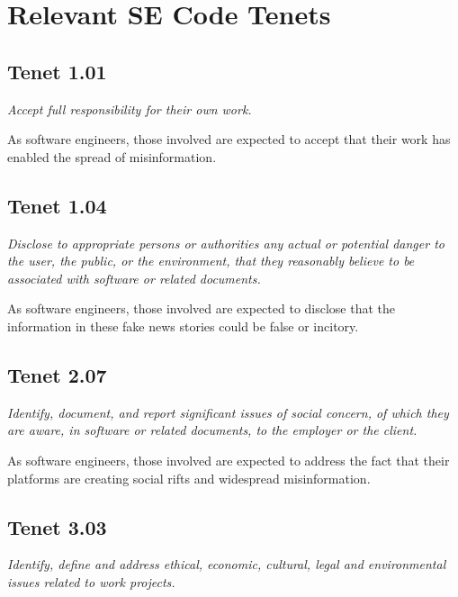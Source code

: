 
\section{Relevant SE Code Tenets}

\subsection{Tenet 1.01}

\emph{Accept full responsibility for their own work. \cite{se_code}}

As software engineers, those involved are expected to accept that their work has enabled the spread of misinformation.


\subsection{Tenet 1.04}

\emph{Disclose to appropriate persons or authorities any actual or potential danger to the user, the public, or the environment, that they reasonably believe to be associated with software or related documents. \cite{se_code}}

As software engineers, those involved are expected to disclose that the information in these fake news stories could be false or incitory.

\subsection{Tenet 2.07}

\emph{Identify, document, and report significant issues of social concern, of which they are aware, in software or related documents, to the employer or the client. \cite{se_code}}

As software engineers, those involved are expected to address the fact that their platforms are creating social rifts and widespread misinformation.

\subsection{Tenet 3.03}

\emph{Identify, define and address ethical, economic, cultural, legal and environmental issues related to work projects. \cite{se_code}}


